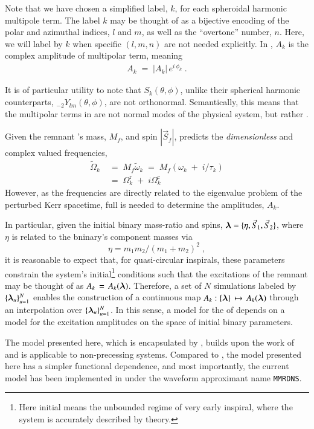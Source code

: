 \documentclass[twocolumn,prd,floatfix,preprintnumbers,a4paper,nofootinbib,superscriptaddress]{revtex4-1}
\newcommand{\cw}{\tilde{\omega}}
\newcommand{\CW}{\tilde{\Omega}}
\newcommand{\CWr}{{\Omega}^{\mathrm{r}}}
\newcommand{\CWc}{{\Omega}^{\mathrm{c}}}
\newcommand{\lalapprox}{\texttt{MMRDNS}}
\begin{document}
%
Note that we have chosen a simplified label, $k$, for each spheroidal harmonic multipole term.
%
The label $k$ may be thought of as a bijective encoding of the polar and azimuthal indices, $l$ and $m$, as well as the ``overtone'' number, $n$.
%
Here, we will label  by $k$ when specific $(l,m,n)$ are not needed explicitly.
%
In , $A_k$ is the complex amplitude of multipolar term, meaning
%
\begin{align}
		A_k \; = \; |A_k| \, e^{i\,\phi_k} \;.
		\label{eq:Ak_amp_phase}
\end{align}
%
\par It is of particular utility to note that $S_k(\theta,\phi)$, unlike their spherical harmonic counterparts, $_{-2}Y_{lm}(\theta,\phi)$, are not orthonormal.
%
Semantically, this means that the multipolar terms in  are not normal modes of the physical system, but rather {}.
%
\par Given the remnant \bh{}'s mass, $M_f$, and spin $|\vec{S}_f|$, \pt{} predicts the \textit{dimensionless} and complex valued \qnm{} frequencies,
%
\begin{align}
	\label{eq:Mw}
	\CW_k \; &= \; M_f \cw{}_k \; = \; M_f ( \omega_k \; + \; i / \tau_k )
	\\ \nonumber
	         &= \; \CWr_k \; + \; i \CWc_k
\end{align}
%
However, as the \qnm{} frequencies are directly related to the eigenvalue problem of the perturbed Kerr spacetime, full \nr{} is needed to determine the \qnm{} amplitudes, $A_k$.
%
\par In particular, given the initial binary mass-ratio and spins, ${\bm{\lambda}} = \{\eta,\vec{S}_{1},\vec{S}_{2}\}$, where $\eta$ is related to the bninary's component masses via $$ \eta = m_1 m_2 / (m_1 + m_2)^2 \; ,$$ it is reasonable to expect that, for quasi-circular inspirals, these parameters constrain the system's initial\footnote{Here initial means the unbounded regime of very early inspiral, where the system is accurately described by \pn{} theory.} conditions such that the \qnm{} excitations of the remnant \bh{} may be thought of as $A_k \, = \, A_k({\bm{\lambda}})$.
%
Therefore, a set of $N$ \nr{} simulations labeled by $\{{\bm{\lambda}}_u\}_{u=1}^N$ enables the construction of a continuous map $ A_k : \{{\bm{\lambda}}\} \, \mapsto \, A_k({\bm{\lambda}})  $ through an interpolation over $\{{\bm{\lambda}}_u\}_{u=1}^N$.
%
In this sense, a model for the \grad{} of \rd{} depends on a model for the \qnm{} excitation amplitudes on the space of initial binary parameters.
%
\par The model presented here, which is encapsulated by , builds upon the work of \cite{London:2014cma} and is applicable to  non-precessing \bbh{} systems.
%
Compared to \cite{London:2014cma}, the model presented here has a simpler functional dependence, and most importantly, the current model has been implemented in \lal{} under the waveform approximant name \lalapprox.
%
\begin{widetext}

\end{widetext}
%
\end{document}
